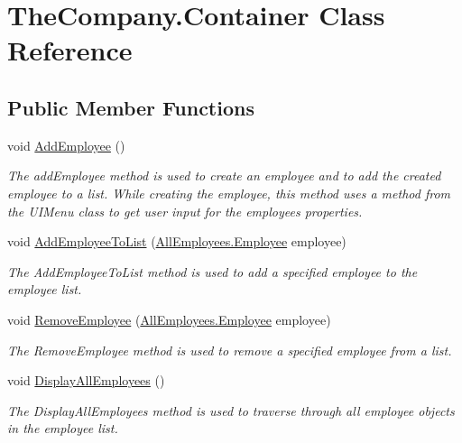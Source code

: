 \hypertarget{class_the_company_1_1_container}{}\section{The\+Company.\+Container Class Reference}
\label{class_the_company_1_1_container}
\subsection*{Public Member Functions}
\begin{DoxyCompactItemize}
\item 
void \hyperlink{class_the_company_1_1_container_a5f7b06d8c706d98dd89d337c00c29d97}{Add\+Employee} ()
\begin{DoxyCompactList}\small\item\em The add\+Employee method is used to create an employee and to add the created employee to a list. While creating the employee, this method uses a method from the U\+I\+Menu class to get user input for the employee\textquotesingle{}s properties. \end{DoxyCompactList}\item 
void \hyperlink{class_the_company_1_1_container_a02df30318efe4c62e6c815f06719d886}{Add\+Employee\+To\+List} (\hyperlink{class_all_employees_1_1_employee}{All\+Employees.\+Employee} employee)
\begin{DoxyCompactList}\small\item\em The Add\+Employee\+To\+List method is used to add a specified employee to the employee list. \end{DoxyCompactList}\item 
void \hyperlink{class_the_company_1_1_container_a83e3bd47b7d2b1a89fc87e70f8fb9082}{Remove\+Employee} (\hyperlink{class_all_employees_1_1_employee}{All\+Employees.\+Employee} employee)
\begin{DoxyCompactList}\small\item\em The Remove\+Employee method is used to remove a specified employee from a list. \end{DoxyCompactList}\item 
void \hyperlink{class_the_company_1_1_container_a4ae3d96ffff3765f4b1f01314fbb4f45}{Display\+All\+Employees} ()
\begin{DoxyCompactList}\small\item\em The Display\+All\+Employees method is used to traverse through all employee objects in the employee list. \end{DoxyCompactList}\item 

\end{DoxyCompactItemize}
